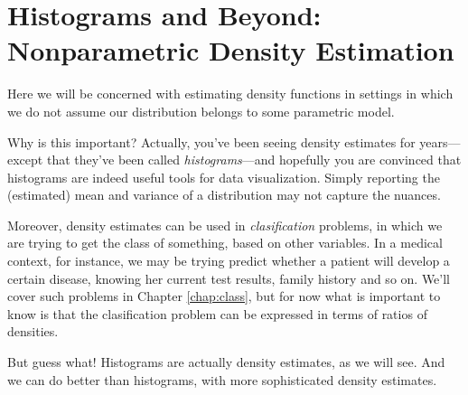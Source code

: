 \chapter{Histograms and Beyond:  Nonparametric Density Estimation}
\label{chap:nonpardens}

Here we will be concerned with estimating density functions in settings
in which we do not assume our distribution belongs to some parametric
model.

Why is this important?  Actually, you've been seeing density estimates
for years---except that they've been called {\it histograms}---and
hopefully you are convinced that histograms are indeed useful tools for
data visualization.  Simply reporting the (estimated) mean and variance
of a distribution may not capture the nuances.

Moreover, density estimates can be used in {\it clasification} problems,
in which we are trying to get the class of something, based on other
variables.  In a medical context, for instance, we may be trying
predict whether a patient will develop a certain disease, knowing her
current test results, family history and so on.  We'll cover such
problems in Chapter \ref{chap:class}, but for now what is important to
know is that the clasification problem can be expressed in terms of
ratios of densities.

But guess what!  Histograms are actually density estimates, as we will
see.  And we can do better than histograms, with more sophisticated
density estimates.

